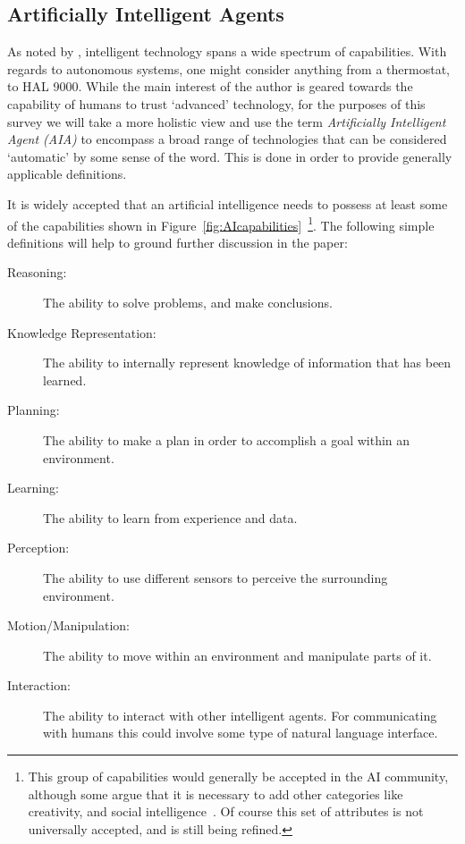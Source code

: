 \subsection{Artificially Intelligent Agents} \label{sec:aias}
    As noted by \citet{Tripp2011-rx}, intelligent technology spans a wide spectrum of capabilities. With regards to autonomous systems, one might consider anything from a thermostat, to HAL 9000. While the main interest of the author is geared towards the capability of humans to trust `advanced' technology, for the purposes of this survey we will take a more holistic view and use the term \textit{Artificially Intelligent Agent (AIA)} to encompass a broad range of technologies that can be considered `automatic' by some sense of the word. This is done in order to provide generally applicable definitions.

    It is widely accepted that an artificial intelligence needs to possess at least some of the capabilities shown in Figure~\ref{fig:AIcapabilities}~\cite{Russell2010-wv,Nilsson2009-rp,Luger2008-vf}\footnote{This group of capabilities would generally be accepted in the AI community, although some argue that it is  necessary to add other categories like creativity, and social intelligence~\cite{Duch2007-oi,Tao2005-kh}. Of course this set of attributes is not universally accepted, and is still being refined.}. The following simple definitions will help to ground further discussion in the paper:

    \begin{description}
        \item [Reasoning:] The ability to solve problems, and make conclusions.
        \item [Knowledge Representation:] The ability to internally represent knowledge of information that has been learned.
        \item [Planning:] The ability to make a plan in order to accomplish a goal within an environment.
        \item [Learning:] The ability to learn from experience and data.
        \item [Perception:] The ability to use different sensors to perceive the surrounding environment.
        \item [Motion/Manipulation:] The ability to move within an environment and manipulate parts of it.
        \item [Interaction:] The ability to interact with other intelligent agents. For communicating with humans this could involve some type of natural language interface.
    \end{description}

